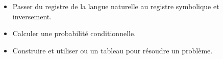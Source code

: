 \documentclass[12pt]{article}
\theoremstyle{break}
\begin{document}
\begin{savoir}{}{}
\begin{itemize}[label=--]
  \item Passer du registre de la langue naturelle au registre symbolique et inversement.
  \item Calculer une probabilité conditionnelle.
  \item Construire et utiliser ou un tableau pour résoudre un problème.
\end{itemize}
\end{savoir}
\end{document}
